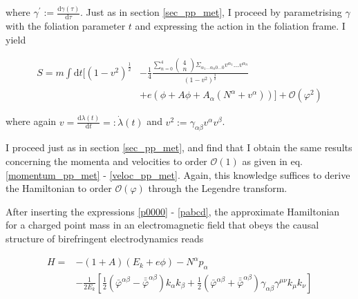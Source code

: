 \documentclass[11pt]{article}
\begin{document}
where $\gamma^\prime := \frac{\mathrm{d} \gamma \left( \tau \right)}{\mathrm{d} \tau}$. Just as in section \ref{sec_pp_met}, I proceed by parametrising $\gamma$ with the foliation parameter $t$ and  expressing the action in the foliation frame. I yield

\begin{equation}
\begin{split}
	S = 
	m \int \mathrm{d} t 
	[
		\left( 
			1 - v^2
		\right)^{\frac{1}{2}}
	&-
	\frac{1}{4}
	\frac{
	\sum_{n = 0}^4 
	\begin{pmatrix}
		4\\ n
	\end{pmatrix}
	 \Sigma_{\alpha_1 \dots \alpha_n 0 \dots 0}
	 v^{\alpha_1} \dots v^{\alpha_n}
	 }{\left( 
			1 - v^2
		\right)^{\frac{3}{2}}} \\
		&+ e \left(
			\phi + A \phi +  A_\alpha \left( N^\alpha + v^\alpha\right)
		\right) 
	]
	+
	\mathcal{O} \left( \varphi^2 \right)
\end{split}
\end{equation}

where again $v = \frac{\mathrm{d} \lambda (t)}{\mathrm{d} t } =: \dot{\lambda} (t) $ and $v^2 := \gamma_{\alpha \beta} v^\alpha v^\beta $. 

I proceed just as in section \ref{sec_pp_met}, and find that I obtain the same results concerning the momenta and velocities to order $\mathcal{O} \left( 1
	\right)$ as given in eq. \ref{momentum_pp_met} - \ref{veloc_pp_met}. Again, this knowledge suffices to derive the Hamiltonian to order  $\mathcal{O} \left( \varphi \right)$ through the Legendre transform.
	
	After inserting the expressions \ref{p0000} - \ref{pabcd}, the approximate Hamiltonian for a charged point mass in an electromagnetic field that obeys the causal structure of birefringent electrodynamics reads
	
\begin{equation}
	\begin{split}
		H = 
		&- \left( 1 + A \right) \left( E_k + e \phi \right) 
		- N^\alpha p_\alpha \\
		&- \frac{1}{2 E_k} \left[ 
			\frac{1}{2} 
			\left( 
				\bar{\varphi}^{\alpha \beta} 
				- \bar{\bar{\varphi}}^{\alpha \beta}
			\right) 
			k_\alpha k_\beta
			+
			\frac{1}{2} 
			\left( 
				\bar{\varphi}^{\alpha \beta} 
				+ \bar{\bar{\varphi}}^{\alpha \beta}
			\right) 
			\gamma_{\alpha \beta} \gamma^{\mu \nu}
			k_\mu k_\nu
		\right]
	\end{split}
\end{equation}
\end{document}
